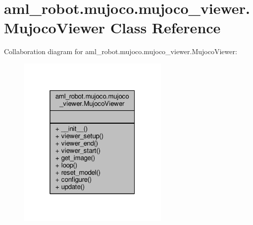 \hypertarget{classaml__robot_1_1mujoco_1_1mujoco__viewer_1_1_mujoco_viewer}{\section{aml\-\_\-robot.\-mujoco.\-mujoco\-\_\-viewer.\-Mujoco\-Viewer Class Reference}
\label{classaml__robot_1_1mujoco_1_1mujoco__viewer_1_1_mujoco_viewer}
}


Collaboration diagram for aml\-\_\-robot.\-mujoco.\-mujoco\-\_\-viewer.\-Mujoco\-Viewer\-:\nopagebreak
\begin{figure}[H]
\begin{center}
\leavevmode
\includegraphics[width=208pt]{classaml__robot_1_1mujoco_1_1mujoco__viewer_1_1_mujoco_viewer__coll__graph}
\end{center}
\end{figure}
